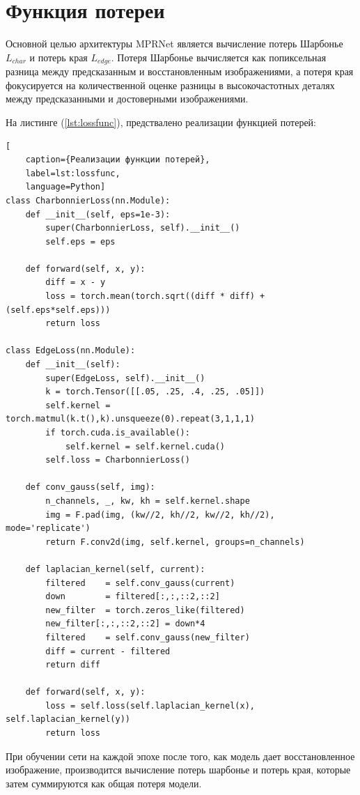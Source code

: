 \section{Функция потереи}

Основной целью архитектуры MPRNet является вычисление потерь Шарбонье \( L_{char} \) и потерь края \( L_{edge} \). Потеря Шарбонье вычисляется как попиксельная разница между предсказанным и восстановленным изображениями, а потеря края фокусируется на количественной оценке разницы в высокочастотных деталях между предсказанными и достоверными изображениями.

На листинге (\ref{lst:lossfunc}), предствалено реализации функцией потерей:
\begin{lstlisting}[
	caption={Реализации функции потерей},
	label=lst:lossfunc,
	language=Python]
class CharbonnierLoss(nn.Module):
    def __init__(self, eps=1e-3):
        super(CharbonnierLoss, self).__init__()
        self.eps = eps

    def forward(self, x, y):
        diff = x - y
        loss = torch.mean(torch.sqrt((diff * diff) + (self.eps*self.eps)))
        return loss

class EdgeLoss(nn.Module):
    def __init__(self):
        super(EdgeLoss, self).__init__()
        k = torch.Tensor([[.05, .25, .4, .25, .05]])
        self.kernel = torch.matmul(k.t(),k).unsqueeze(0).repeat(3,1,1,1)
        if torch.cuda.is_available():
            self.kernel = self.kernel.cuda()
        self.loss = CharbonnierLoss()

    def conv_gauss(self, img):
        n_channels, _, kw, kh = self.kernel.shape
        img = F.pad(img, (kw//2, kh//2, kw//2, kh//2), mode='replicate')
        return F.conv2d(img, self.kernel, groups=n_channels)

    def laplacian_kernel(self, current):
        filtered    = self.conv_gauss(current)
        down        = filtered[:,:,::2,::2]
        new_filter  = torch.zeros_like(filtered)
        new_filter[:,:,::2,::2] = down*4
        filtered    = self.conv_gauss(new_filter)
        diff = current - filtered
        return diff

    def forward(self, x, y):
        loss = self.loss(self.laplacian_kernel(x), self.laplacian_kernel(y))
        return loss
\end{lstlisting}

При обучении сети на каждой эпохе после того, как модель дает восстановленное изображение, производится вычисление потерь шарбонье и потерь края, которые затем суммируются как общая потеря модели.

